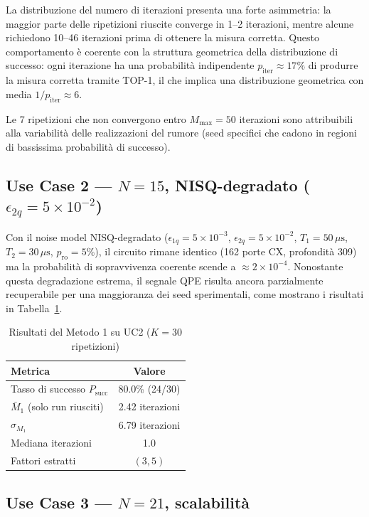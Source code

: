 \begin{onehalfspace}
La distribuzione del numero di iterazioni presenta una forte asimmetria: la maggior parte delle ripetizioni riuscite converge in 1--2 iterazioni, mentre alcune richiedono 10--46 iterazioni prima di ottenere la misura corretta. Questo comportamento è coerente con la struttura geometrica della distribuzione di successo: ogni iterazione ha una probabilità indipendente $p_{\text{iter}} \approx 17\%$ di produrre la misura corretta tramite TOP-1, il che implica una distribuzione geometrica con media $1/p_{\text{iter}} \approx 6$.

Le 7 ripetizioni che non convergono entro $M_{\text{max}}=50$ iterazioni sono attribuibili alla variabilità delle realizzazioni del rumore (seed specifici che cadono in regioni di bassissima probabilità di successo).

\subsection{Use Case 2 — $N = 15$, NISQ-degradato ($\epsilon_{2q} = 5 \times 10^{-2}$)}
\label{sec:uc2_m1}

Con il noise model NISQ-degradato ($\epsilon_{1q} = 5\times10^{-3}$, $\epsilon_{2q} = 5\times10^{-2}$, $T_1 = 50\,\mu\text{s}$, $T_2 = 30\,\mu\text{s}$, $p_{\text{ro}} = 5\%$), il circuito rimane identico (162 porte CX, profondità 309) ma la probabilità di sopravvivenza coerente scende a $\approx 2\times10^{-4}$. Nonostante questa degradazione estrema, il segnale QPE risulta ancora parzialmente recuperabile per una maggioranza dei seed sperimentali, come mostrano i risultati in Tabella~\ref{tab:m1_uc2}.

\begin{table}[H]
\centering
\caption{Risultati del Metodo 1 su UC2 ($K=30$ ripetizioni)}
\label{tab:m1_uc2}
\begin{tabular}{lc}
\hline
\textbf{Metrica} & \textbf{Valore} \\
\hline
Tasso di successo $P_{\text{succ}}$ & 80.0\% (24/30) \\
$\bar{M}_1$ (solo run riusciti) & 2.42 iterazioni \\
$\sigma_{M_1}$ & 6.79 iterazioni \\
Mediana iterazioni & 1.0 \\
Fattori estratti & $(3, 5)$ \\
\hline
\end{tabular}
\end{table}

\subsection{Use Case 3 — $N = 21$, scalabilità}
\label{sec:uc3_m1}


\end{onehalfspace}
